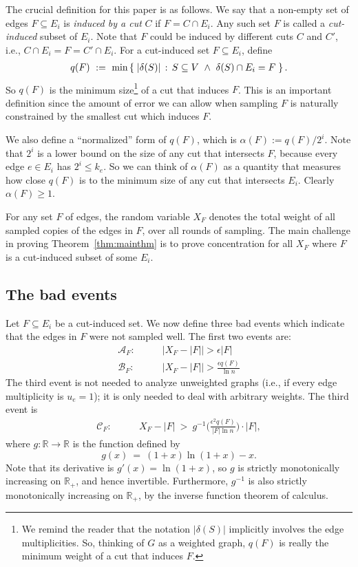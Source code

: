 \documentclass[11pt]{article}
\numberwithin{equation}{section}
\newcommand{\newterm}[1]{\textit{#1}}
\newcommand{\bR}{\mathbb{R}}
\newcommand{\cA}{\mathcal{A}}
\newcommand{\cB}{\mathcal{B}}
\newcommand{\cC}{\mathcal{C}}
\newcommand{\intersect}{\cap}
\newcommand{\abs}[1]{\lvert #1 \rvert}
\newcommand{\card}[1]{\abs{#1}}
\newcommand{\EquationName}[1]{\label{eq:#1}}
\newcommand{\SectionName}[1]{\label{sec:#1}}
\newcommand{\Theorem}[1]{Theorem~\ref{thm:#1}}
\begin{document}
The crucial definition for this paper is as follows.
We say that a non-empty set of edges $F \subseteq E_i$ is 
\newterm{induced by a cut} $C$ if $F=C \intersect E_i$.
Any such set $F$ is called a \newterm{cut-induced} subset of $E_i$.
Note that $F$ could be induced by different cuts $C$ and $C'$,
i.e., $C \cap E_i = F = C' \cap E_i$.
For a cut-induced set $F \subseteq E_i$, define
\begin{align}
\EquationName{qdef}
q(F)   ~:=~ \min \setst{ |\delta(S)| }{ S \subseteq V ~\wedge~ \delta(S) \intersect E_i = F }.
\end{align}
So $q(F)$ is the minimum size\footnote{We remind the reader that the notation
$\card{\delta(S)}$ implicitly involves the edge multiplicities.
So, thinking of $G$ as a weighted graph,
$q(F)$ is really the minimum weight of a cut that induces $F$.}
of a cut that induces $F$.
This is an important definition since the amount of error we can allow
when sampling $F$ is naturally constrained by the smallest cut which induces $F$.

We also define a ``normalized'' form of $q(F)$, which is $\alpha(F) := q(F) / 2^i$.
Note that $2^i$ is a lower bound on the size of any cut that intersects $F$,
because every edge $e \in E_i$ has $2^i \leq k_e$.
So we can think of $\alpha(F)$ as a quantity that measures how close $q(F)$
is to the minimum size of any cut that intersects $E_i$.
Clearly $\alpha(F) \geq 1$.

For any set $F$ of edges, the random variable $X_F$ denotes 
the total weight of all sampled copies of the edges in $F$, over all rounds of sampling.
The main challenge in proving \Theorem{mainthm} is to prove concentration for
all $X_F$ where $F$ is a cut-induced subset of some $E_i$.

\subsection{The bad events}
\SectionName{badevents}

Let $F\subseteq E_i$ be a cut-induced set.
We now define three bad events which indicate that the edges in $F$ were not sampled well.
The first two events are:
\begin{align*}
\cA_F:&\qquad |X_F-|F|| > \epsilon |F| \\
\cB_F:&\qquad |X_F-|F|| > \frac{\epsilon q(F)}{\ln n}
\end{align*}
The third event is not needed to analyze unweighted graphs
(i.e., if every edge multiplicity is $u_e = 1$);
it is only needed to deal with arbitrary weights.
The third event is
\begin{align*}
\cC_F:&\qquad
    X_F-|F| ~>~ g^{-1}\Bigg( \frac{ \epsilon^2 q(F) }{ |F| \ln n } \Bigg) \cdot |F|,
\end{align*}
where $g : \bR \rightarrow \bR$ is the function defined by
\begin{equation}
\EquationName{gdef}
g(x) ~=~ (1+x) \ln( 1+x ) - x.
\end{equation}
Note that its derivative is $g'(x) = \ln(1+x)$,
so $g$ is strictly monotonically increasing on $\bR_+$, and hence invertible.
Furthermore, $g^{-1}$ is also strictly monotonically increasing on $\bR_+$,
by the inverse function theorem of calculus.
\end{document}
